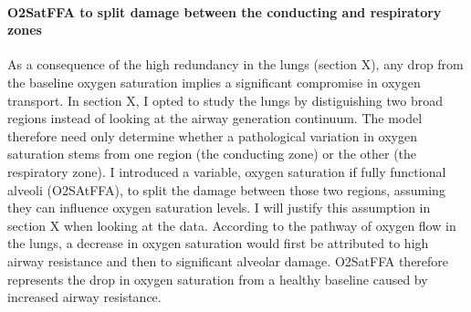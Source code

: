 \paragraph{O2SatFFA to split damage between the conducting and respiratory zones}
As a consequence of the high redundancy in the lungs (section X), any drop from the baseline oxygen saturation implies a significant compromise in oxygen transport. In section X, I opted to study the lungs by distiguishing two broad regions instead of looking at the airway generation continuum. The model therefore need only  determine whether a pathological variation in oxygen saturation stems from one region (the conducting zone) or the other (the respiratory zone). I introduced a variable, oxygen saturation if fully functional alveoli (O2SAtFFA), to split the damage between those two regions, assuming they can influence oxygen saturation levels. I will justify this assumption in section X when looking at the data. According to the pathway of oxygen flow in the lungs, a decrease in oxygen saturation would first be attributed to high airway resistance and then to significant alveolar damage. O2SatFFA therefore represents the drop in oxygen saturation from a healthy baseline caused by increased airway resistance.


